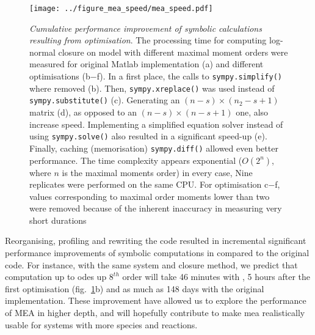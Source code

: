 \begin{figure}[tbh]

\texttt{[image: ../figure\_mea\_speed/mea\_speed.pdf]}
\caption{\emph{Cumulative performance improvement of symbolic 
calculations resulting from optimisation}.
The processing time for computing log-normal closure on \pft{} model with different maximal moment orders were measured for original Matlab implementation (a) and different optimisations (b$-$f).
In a first place, the calls to \texttt{sympy.simplify()} where removed (b). 
Then, \texttt{sympy.xreplace()} was used instead of \texttt{sympy.substitute()} (c). 
Generating an $(n-s) \times (n_2-s + 1)$ matrix (d), as opposed to an $(n-s) \times (n-s + 1)$ one, also increase speed.
Implementing a simplified equation solver instead of using \texttt{sympy.solve()} also resulted in a significant speed-up (e). 
Finally, caching (memorisation) \texttt{sympy.diff()} allowed even better performance.
The time complexity appears exponential ($O(2^n)$, where $n$ is the maximal moments order) in every case, 
Nine replicates were performed on the same CPU. 
For optimisation c$-$f, values corresponding to maximal order moments lower than two were removed because of the inherent inaccuracy in measuring very short durations
}
\label{fig:mea_speed}
\end{figure}


Reorganising, profiling and rewriting the code resulted in incremental significant performance improvements of symbolic computations in \means{} compared to the original \mat{} code.
For instance, with the same \pft{} system and closure method, 
we predict that computation up to \gls{ode}s up $8^{th}$ order will take 46 minutes with \means{}, 5 hours after the first optimisation (fig.~\ref{fig:mea_speed}b) and as much as 148 days with the original implementation.
These improvement have allowed us to explore the performance of MEA in higher depth, and will hopefully contribute to make \gls{mea} realistically usable for systems with more species and reactions.

